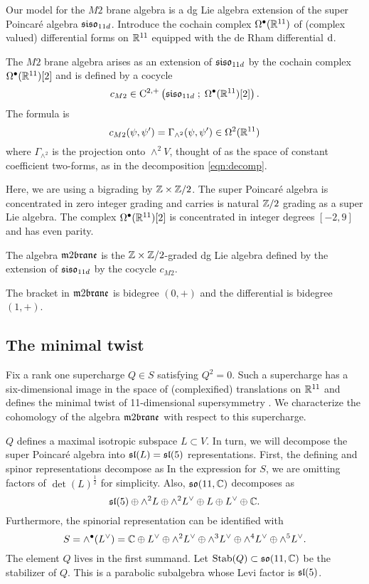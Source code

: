 Our model for the $M2$ brane algebra is a dg Lie algebra extension of the super Poincar\'e algebra $\mathfrak{siso}_{11d}$.
Introduce the cochain complex $\Omega^{\bullet}(\mathbb R^{11})$ of (complex valued) differential forms on $\mathbb R^{11}$ equipped with the de Rham differential ${\rm d}$.
 
The $M2$ brane algebra arises as an extension of $\mathfrak{siso}_{11d}$ by the cochain complex $\Omega^\bullet(\mathbb R^{11})[2]$ and is defined by a cocycle
\[
    c_{M2} \in {\rm C}^{2,+} \left(\mathfrak{siso}_{11d} \; ; \; \Omega^\bullet (\mathbb R^{11})[2]\right) .
\]
The formula is
  \[c_{M2} (\psi, \psi') = \Gamma_{\wedge^2}(\psi, \psi') \in \Omega^2(\mathbb R^{11})\]
  where $\Gamma_{\wedge^2}$ is the projection onto $\wedge^2 V$, thought of as the space of constant coefficient two-forms, as in the decomposition \eqref{eqn:decomp}.
  
Here, we are using a bigrading by $\mathbb Z \times \mathbb Z/2$. 
The super Poincar\'e algebra is concentrated in zero integer grading and carries is natural $\mathbb Z/2$ grading as a super Lie algebra.
The complex $\Omega^{\bullet}(\mathbb R^{11})[2]$ is concentrated in integer degrees $[-2,9]$ and has even parity.

\begin{dfn}
The algebra $\m2$ is the $\mathbb Z \times \mathbb Z/2$-graded dg Lie algebra defined by the extension of $\mathfrak{siso}_{11d}$ by the cocycle $c_{M2}$.  
\end{dfn}

The bracket in $\m2$ is bidegree $(0,+)$ and the differential is bidegree $(1,+)$.

\subsection{The minimal twist}
\label{sec:mintwist}

Fix a rank one supercharge $Q \in S$ satisfying $Q^2 = 0$.
Such a supercharge has a six-dimensional image in the space of (complexified) translations on $\mathbb R^{11}$ and defines the minimal twist of 11-dimensional supersymmetry \cite{SWspinor}. 
We characterize the cohomology of the algebra $\m2$ with respect to this supercharge. 

$Q$ defines a maximal isotropic subspace $L \subset V$. 
In turn, we will decompose the super Poincar\'e algebra into $\mathfrak{sl}(L) = \mathfrak{sl}(5)$ representations.
First, the defining and spinor representations decompose as
In the expression for $S$, we are omitting factors of $\det(L)^{\frac12}$ for simplicity. 
Also, $\mathfrak{so}(11, \mathbb C)$ decomposes as
\[
\mathfrak{sl}(5) \oplus \wedge^2 L \oplus \wedge^2 L^\vee \oplus L \oplus L^\vee \oplus \mathbb{C} .
\]
Furthermore, the spinorial representation can be identified with
\[
S = \wedge^\bullet (L^\vee) = \mathbb C \oplus L^\vee \oplus \wedge^2 L^\vee \oplus \wedge^3 L^\vee \oplus \wedge^4 L^\vee \oplus \wedge^5 L^\vee .
\]
The element $Q$ lives in the first summand.
Let ${\rm Stab}(Q) \subset \mathfrak{so}(11,\mathbb C)$ be the stabilizer of $Q$. 
This is a parabolic subalgebra whose Levi factor is $\mathfrak{sl}(5)$.

